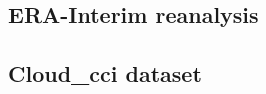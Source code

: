 

\subsection{ERA-Interim reanalysis}\label{sec:era}

\subsection{Cloud\_cci dataset}\label{sec:cloudcci}
